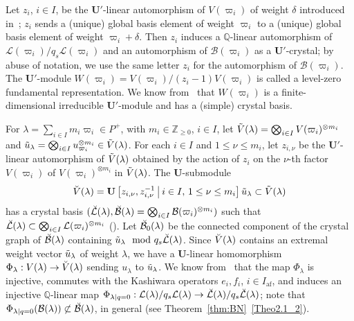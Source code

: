 \documentclass[10pt]{amsart}
\theoremstyle{definition}\newtheorem{defi}[theo]{Definition}
\theoremstyle{remark}\newtheorem{rema}[theo]{Remark}
\newcommand{\BQ}{\mathbb{Q}}
\newcommand{\BZ}{\mathbb{Z}}
\newcommand{\U}{\mathbf{U}}
\DeclareMathOperator{\af}{af}
\begin{document}
Let $z_i$, $i \in I$, be the $\U'$-linear automorphism of $V(\varpi_i)$ of weight $\delta$ introduced in~\cite[\S~5.2]{K02}; $z_i$ sends a (unique) global basis element of weight $\varpi_i$ to a (unique) global basis element of weight $\varpi_i+\delta$. 
Then $z_i$ induces a
$\BQ$-linear automorphism of 
$\mathcal{L}(\varpi_i) / q_s \mathcal{L}(\varpi_i)$
and an automorphism of 
$\mathcal{B}(\varpi_i)$ 
as a $\U'$-crystal; 
by abuse of notation, 
we use the same letter 
$z_i$ 
for the automorphism of 
$\mathcal{B}(\varpi_i)$. 
The $\U'$-module 
$W(\varpi_i) = V(\varpi_i) / (z_i - 1)V(\varpi_i)$
is called a level-zero fundamental representation. 
We know from~\cite[Theorem~5.17]{K02} that 
$W(\varpi_i)$ is a finite-dimensional irreducible $\U'$-module 
and has a (simple) crystal basis. 

For 
$\lambda = \sum_{i \in I} m_i \varpi_i \in P^+$, 
with 
$m_i \in \BZ_{\geq 0}$, $i \in I$, 
let 
$\Tilde{V}(\lambda) = \bigotimes_{i \in I} V(\varpi_i)^{\otimes m_i}$ 
and 
$\Tilde{u}_{\lambda} = \bigotimes_{i \in I} u_{\varpi_i}^{\otimes m_i} \in \Tilde{V}(\lambda)$. 
For each $i \in I$ and $1 \leq \nu \leq m_i$, let $z_{i,\nu}$ be the $\U'$-linear automorphism of $\Tilde{V}(\lambda)$ obtained by the action of $z_i$ on the $\nu$-th factor $V(\varpi_i)$ of $V(\varpi_i)^{\otimes m_i}$ in $\Tilde{V}(\lambda)$. The $\U$-submodule 
\begin{align}
\Breve{V}(\lambda) = \U \left[z_{i,\nu}, z_{i,\nu}^{-1} \ \vline \ i \in I , \, 1 \leq \nu \leq m_i \right] \Tilde{u}_{\lambda} \subset \Tilde{V}(\lambda)
\end{align}
has a crystal basis 
$(\Breve{\mathcal{L}}(\lambda) , \Breve{\mathcal{B}}(\lambda) = \bigotimes_{i \in I} \mathcal{B}(\varpi_i)^{\otimes m_i})$ 
such that 
$\Breve{\mathcal{L}}(\lambda) \subset \bigotimes_{i \in I} \mathcal{L}(\varpi_i)^{\otimes m_i}$
(\cite[Theorem~8.5]{K02}). 
Let
$\Breve{\mathcal{B}}_0(\lambda)$
be the connected component of the crystal graph of 
$\Breve{\mathcal{B}}(\lambda)$
containing 
$\Tilde{u}_{\lambda} \mod q_s \Breve{\mathcal{L}}(\lambda)$.
Since $\Breve{V}(\lambda)$ contains an extremal weight vector 
$\Tilde{u}_{\lambda}$ of weight $\lambda$, 
we have a $\U$-linear homomorphism
$\Phi_{\lambda} : V(\lambda) \rightarrow \Breve{V}(\lambda)$
sending $u_{\lambda}$ to $\Tilde{u}_{\lambda}$. 
We know from~\cite[\S~4.2]{BN04} that the map 
$\Phi_{\lambda}$ 
is injective, 
commutes with the Kashiwara operators 
$e_i , f_i$, $i \in I_{\af}$, 
and induces an injective $\BQ$-linear map
$\Phi_{\lambda \mid q=0} : \mathcal{L}(\lambda) / q_s \mathcal{L}(\lambda) \rightarrow \Breve{\mathcal{L}}(\lambda) / q_s \Breve{\mathcal{L}}(\lambda)$; 
note that 
$\Phi_{\lambda \mid q=0}(\mathcal{B}(\lambda)) \not\subset \Breve{\mathcal{B}}(\lambda)$, 
in general (see Theorem~\ref{thm:BN}~\ref{Theo2.1_2}).
\end{document}
